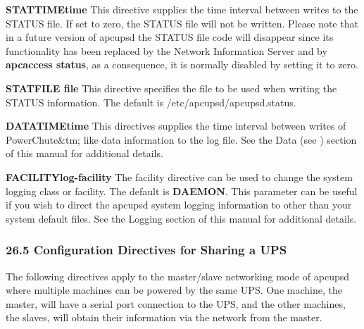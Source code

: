 \begin{description}

\item {\bf STATTIME\lt{}time\gt{}}
This directive supplies the time interval between writes to the STATUS file.
If set to zero, the STATUS file will not be written. Please note that in a
future version of apcupsd the STATUS file code will disappear since its
functionality has been replaced by the Network Information Server and by {\bf
apcaccess status}, as a consequence, it is normally disabled by setting it to
zero.  

\item {\bf STATFILE \lt{}file\gt{}}
This directive specifies the file to be used when writing the STATUS
information. The default is /etc/apcupsd/apcupsd.status.  

\item {\bf DATATIME\lt{}time\gt{}}
This directives supplies the time interval between writes of PowerChute\&tm;
like data information to the log file. See the Data (see 
) section of this manual for
additional details.  

\item {\bf FACILITY\lt{}log-facility\gt{}}
The facility directive can be used to change the system logging class or
facility. The default is {\bf DAEMON}. This parameter can be useful if you
wish to direct the apcupsd system logging information to other than your
system default files. See the Logging section of this manual for additional
details. 
\end{description}

\label{Configuration-Directives-for-Sharing-a-UPS}

\subsubsection*{26.5 Configuration Directives for Sharing a UPS}

\label{index-Directives-Sharing-247}
The following directives apply to the master/slave networking mode of apcupsd
where multiple machines can be powered by the same UPS. One machine, the
master, will have a serial port connection to the UPS, and the other machines,
the slaves, will obtain their information via the network from the master.  

